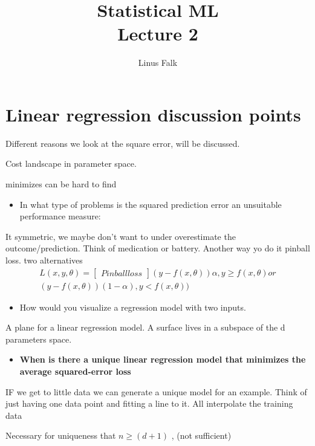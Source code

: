 \documentclass[a4paper]{article}
\title{Statistical ML \\ Lecture 2}
\author{Linus Falk}
\begin{document}
\maketitle
\section{Linear regression discussion points}
Different reasons we look at the square error, will be discussed. 

Cost landscape in parameter space. 

minimizes can be hard to find 

\begin{itemize}
	\item In what type of problems is the squared prediction error an unsuitable performance measure:
\end{itemize}

It symmetric, we maybe don't want to under overestimate the outcome/prediction. Think of medication or battery. Another way yo do it 
pinball loss. two alternatives 
\begin{equation}
\begin{aligned}
L(x,y,\theta ) = \begin{bmatrix} Pinball loss \end{bmatrix} (y-f(x,\theta)) \alpha , y \ge f(x, \theta) or \\
(y-f(x,\theta))(1-\alpha), y < f(x, \theta))
\end{aligned}
\end{equation}

\begin{itemize}
	\item How would you visualize a regression model with two inputs.
\end{itemize}

A plane for a linear regression model. A surface lives in a subspace of the d parameters space. 

\begin{itemize}
	\item \textbf{When is there a unique linear regression model that minimizes the average squared-error loss} 
\end{itemize}

IF we get to little data we can generate a unique model for an example. Think of just having one data point and fitting a line to it. 
All interpolate the training data 

Necessary for uniqueness that $n \ge (d+1)$ , (not sufficient)
\end{document}
